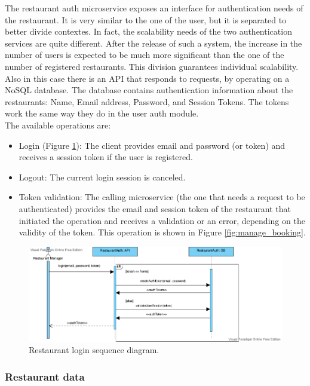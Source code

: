 The restaurant auth microservice exposes an interface for authentication needs of the
restaurant. It is very similar to the one of the user, but it is separated to better
divide contextes. In fact, the scalability needs of the two authentication services are
quite different. After the release of such a system, the increase in the number of users
is expected to be much more significant than the one of the number of registered
restaurants. This division guarantees individual scalability.
Also in this case there is an API that responds to requests, by operating on a
NoSQL database. The database contains authentication information about the restaurants:
Name, Email address, Password, and Session Tokens. The tokens work the same way they
do in the user auth module.\\
The available operations are:
\begin{itemize}
    \item Login (Figure \ref{fig:restaurant_login}): The client provides email and
    password (or token) and receives a session token if the user is registered.
    \item Logout: The current login session is canceled.
    \item Token validation: The calling microservice (the one that needs a request to
    be authenticated) provides the email and session token of the restaurant that initiated
    the operation and receives a validation or an error, depending on the validity of
    the token. This operation is shown in Figure \ref{fig:manage_booking}.
\end{itemize}

\begin{figure}
    \includegraphics[width=\linewidth]{../docs/sequence/restaurantAuth/restaurantAuth.png}
    \caption{Restaurant login sequence diagram.}
    \label{fig:restaurant_login}
\end{figure}

\subsubsection{Restaurant data}

